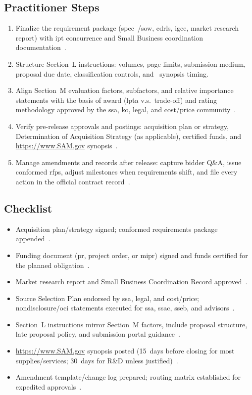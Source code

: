 \documentclass[../main.tex]{subfiles}
\begin{document}
\subsection{Practitioner Steps}
\begin{enumerate}
	\item Finalize the requirement package (spec~/\ac{sow}, \acp{cdrl}, \ac{igce}, market research report) with \ac{ipt} concurrence and Small Business coordination documentation~\autocite{FAR,edo-3-2-2-solicitation-prep-2025}.
	\item Structure Section~L instructions: volumes, page limits, submission medium, proposal due date, classification controls, and~\autocite[\S~5.203]{FAR} synopsis timing.
	\item Align Section~M evaluation factors, subfactors, and relative importance statements with the basis of award (\ac{lpta} v.s.\ trade-off) and rating methodology approved by the \ac{ssa}, \ac{ko}, legal, and cost/price community~\autocite{FAR,NAVSEA-Source-Selection-Guide-2022}.
	\item Verify pre-release approvals and postings: acquisition plan or strategy, Determination of Acquisition Strategy (as applicable), certified funds, and \url{https://www.SAM.gov} synopsis~\autocite{NMCARS,edo-3-2-2-solicitation-prep-2025}.
	\item Manage amendments and records after release: capture bidder Q\&A, issue conformed \acp{rfp}, adjust milestones when requirements shift, and file every action in the official contract record~\autocite{FAR,NAVSEA-Contracts-Handbook-2023}.
\end{enumerate}

\subsection{Checklist}
\begin{itemize}
	\item Acquisition plan/strategy signed; conformed requirements package appended~\autocite{NMCARS}.
	\item Funding document (\ac{pr}, project order, or \ac{mipr}) signed and funds certified for the planned obligation~\autocite{FAR}.
	\item Market research report and Small Business Coordination Record approved~\autocite{FAR}.
	\item Source Selection Plan endorsed by \ac{ssa}, legal, and cost/price; nondisclosure/\ac{oci} statements executed for \ac{ssa}, \ac{ssac}, \ac{sseb}, and advisors~\autocite{NAVSEA-Source-Selection-Guide-2022}.
	\item Section~L instructions mirror Section~M factors, include proposal structure, late proposal policy, and submission portal guidance~\autocite{FAR}.
	\item \url{https://www.SAM.gov} synopsis posted (15~days before closing for most supplies/services; 30~days for R\&D unless justified)~\autocite{FAR}.
	\item Amendment template/change log prepared; routing matrix established for expedited approvals~\autocite{NAVSEA-Contracts-Handbook-2023}.
\end{itemize}
\end{document}
